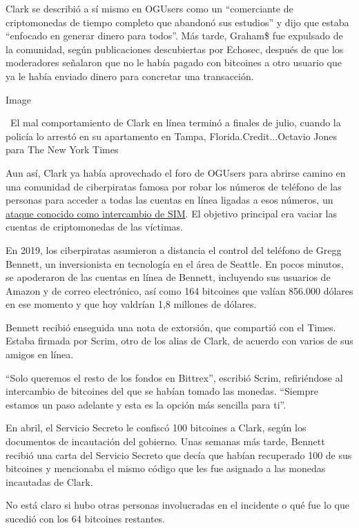 Clark se describió a sí mismo en OGUsers como un ``comerciante de
criptomonedas de tiempo completo que abandonó sus estudios'' y dijo que
estaba ``enfocado en generar dinero para todos''. Más tarde, Graham\$
fue expulsado de la comunidad, según publicaciones descubiertas por
Echosec, después de que los moderadores señalaron que no le había pagado
con bitcoines a otro usuario que ya le había enviado dinero para
concretar una transacción.

Image

~El mal comportamiento de Clark en línea terminó a finales de julio,
cuando la policía lo arrestó en su apartamento en Tampa,
Florida.Credit...Octavio Jones para The New York Times

Aun así, Clark ya había aprovechado el foro de OGUsers para abrirse
camino en una comunidad de ciberpiratas famosa por robar los números de
teléfono de las personas para acceder a todas las cuentas en línea
ligadas a esos números, un
\href{https://www.nytimes3xbfgragh.onion/2017/08/21/business/dealbook/phone-hack-bitcoin-virtual-currency.html}{ataque
conocido como intercambio de SIM}. El objetivo principal era vaciar las
cuentas de criptomonedas de las víctimas.

En 2019, los ciberpiratas asumieron a distancia el control del teléfono
de Gregg Bennett, un inversionista en tecnología en el área de Seattle.
En pocos minutos, se apoderaron de las cuentas en línea de Bennett,
incluyendo sus usuarios de Amazon y de correo electrónico, así como 164
bitcoines que valían 856.000 dólares en ese momento y que hoy valdrían
1,8 millones de dólares.

Bennett recibió enseguida una nota de extorsión, que compartió con el
Times. Estaba firmada por Scrim, otro de los alias de Clark, de acuerdo
con varios de sus amigos en línea.

``Solo queremos el resto de los fondos en Bittrex'', escribió Scrim,
refiriéndose al intercambio de bitcoines del que se habían tomado las
monedas. ``Siempre estamos un paso adelante y esta es la opción más
sencilla para ti''.

En abril, el Servicio Secreto le confiscó 100 bitcoines a Clark, según
los documentos de incautación del gobierno. Unas semanas más tarde,
Bennett recibió una carta del Servicio Secreto que decía que habían
recuperado 100 de sus bitcoines y mencionaba el mismo código que les fue
asignado a las monedas incautadas de Clark.

No está claro si hubo otras personas involucradas en el incidente o qué
fue lo que sucedió con los 64 bitcoines restantes.

